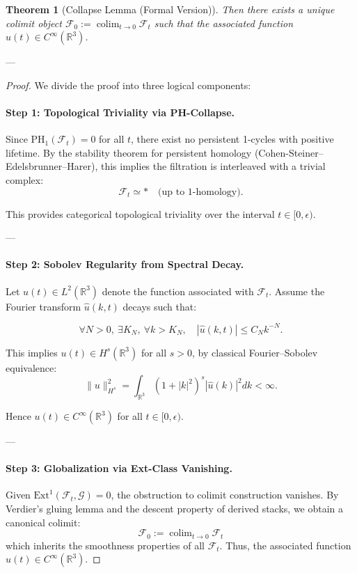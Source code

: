 \documentclass[11pt]{article}
\DeclareMathOperator{\colim}{colim}
\newtheorem{theorem}{Theorem}[section]
\begin{document}
\begin{axiom}
\begin{axiom}
{{\begin{theorem}[Collapse Lemma (Formal Version)]
Then there exists a unique colimit object \( \mathcal{F}_0 := \colim_{t \to 0} \mathcal{F}_t \)  
such that the associated function \( u(t) \in C^\infty(\mathbb{R}^3) \).
\end{theorem}

---

\begin{proof}
We divide the proof into three logical components:

\paragraph{Step 1: Topological Triviality via PH-Collapse.}
Since \( \mathrm{PH}_1(\mathcal{F}_t) = 0 \) for all \( t \),  
there exist no persistent 1-cycles with positive lifetime.  
By the stability theorem for persistent homology (Cohen-Steiner–Edelsbrunner–Harer),  
this implies the filtration is interleaved with a trivial complex:  
\[
\mathcal{F}_t \simeq \ast \quad \text{(up to 1-homology)}.
\]

This provides categorical topological triviality over the interval \( t \in [0, \epsilon) \).

---

\paragraph{Step 2: Sobolev Regularity from Spectral Decay.}
Let \( u(t) \in L^2(\mathbb{R}^3) \) denote the function associated with \( \mathcal{F}_t \).  
Assume the Fourier transform \( \widehat{u}(k, t) \) decays such that:

\[
\forall N > 0,\ \exists K_N,\ \forall k > K_N,\quad
|\widehat{u}(k, t)| \leq C_N k^{-N}.
\]

This implies \( u(t) \in H^s(\mathbb{R}^3) \) for all \( s > 0 \),  
by classical Fourier–Sobolev equivalence:
\[
\| u \|_{H^s}^2 = \int_{\mathbb{R}^3} (1 + |k|^2)^s |\widehat{u}(k)|^2 dk < \infty.
\]

Hence \( u(t) \in C^\infty(\mathbb{R}^3) \) for all \( t \in [0, \epsilon) \).

---

\paragraph{Step 3: Globalization via Ext-Class Vanishing.}
Given \( \mathrm{Ext}^1(\mathcal{F}_t, \mathcal{G}) = 0 \),  
the obstruction to colimit construction vanishes.  
By Verdier’s gluing lemma and the descent property of derived stacks,  
we obtain a canonical colimit:
\[
\mathcal{F}_0 := \colim_{t \to 0} \mathcal{F}_t
\]
which inherits the smoothness properties of all \( \mathcal{F}_t \).  
Thus, the associated function \( u(t) \in C^\infty(\mathbb{R}^3) \).


\end{proof}}}
\end{axiom}
\end{axiom}
\end{document}

